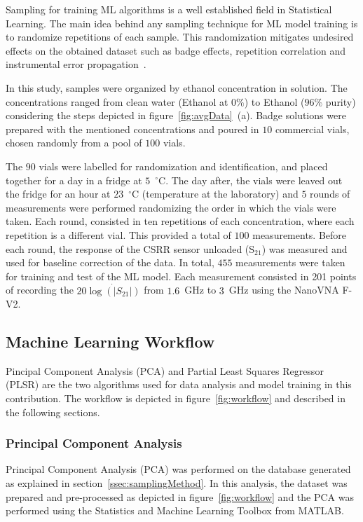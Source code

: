 \documentclass[journal,twoside,web]{ieeecolor}
\begin{document}
Sampling for training ML algorithms is a well established field in Statistical Learning. The main idea behind any sampling technique for ML model training is to randomize repetitions of each sample. This randomization mitigates undesired effects on the obtained dataset such as badge effects, repetition correlation and instrumental error propagation~\cite{Wu2020}. 

In this study, samples were organized by ethanol concentration in solution. The concentrations ranged from clean water (Ethanol at $0\%$) to Ethanol ($96\%$ purity) considering the steps depicted in figure~\ref{fig:avgData}~(a). Badge solutions were prepared with the mentioned concentrations and poured in $10$ commercial vials, chosen randomly from a pool of $100$ vials.

The $90$ vials were labelled for randomization and identification, and placed together for a day in a fridge at $5$~$^{\circ}$C. The day after, the vials were leaved out the fridge for an hour at $23$~$^{\circ}$C (temperature at the laboratory) and $5$ rounds of measurements were performed randomizing the order in which the vials were taken. Each round, consisted in ten repetitions of each concentration, where each repetition is a different vial. This provided a total of $100$ measurements. 
Before each round, the response of the CSRR sensor unloaded (S$_{21}$) was measured and used for baseline correction of the data. In total, $455$ measurements were taken for training and test of the ML model. Each measurement consisted in 201 points of recording the $20\dot{\log\left(|S_{21}|\right)}$ from $1.6$~GHz to $3$~GHz using the NanoVNA F-V2.
\subsection{Machine Learning Workflow}
\label{ssec:mlWorkflow}

 Pincipal Component Analysis (PCA) and Partial Least Squares Regressor (PLSR) are the two algorithms used for data analysis and model training in this contribution. The workflow is depicted in figure~\ref{fig:workflow} and described in the following sections.
\subsubsection{Principal Component Analysis}
\label{sssec:pca}

Principal Component Analysis (PCA) was performed on the 
database generated as explained in section~\ref{ssec:samplingMethod}. In this analysis, the dataset was prepared and pre-processed as depicted in figure~\ref{fig:workflow} and the PCA was performed using the Statistics and Machine Learning Toolbox from MATLAB. 
\end{document}
